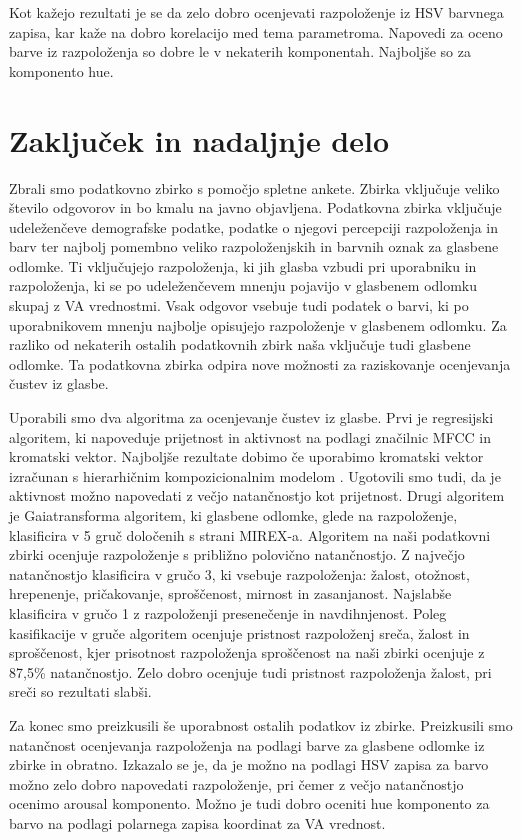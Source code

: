 \documentclass[a4paper, 12pt]{book}
\begin{document}
{Kot kažejo rezultati je se da zelo dobro ocenjevati razpoloženje iz HSV barvnega zapisa, kar kaže na dobro korelacijo med tema parametroma. Napovedi za oceno barve iz razpoloženja so dobre le v nekaterih komponentah. Najboljše so za komponento hue. 

\chapter{Zaključek in nadaljnje delo}

Zbrali smo podatkovno zbirko s pomočjo spletne ankete. Zbirka vključuje veliko število odgovorov in bo kmalu na javno objavljena. Podatkovna zbirka vključuje udeleženčeve demografske podatke, podatke o njegovi percepciji razpoloženja in barv ter najbolj pomembno veliko razpoloženjskih in barvnih oznak za glasbene odlomke. Ti vključujejo razpoloženja, ki jih glasba vzbudi pri uporabniku in razpoloženja, ki se po udeleženčevem mnenju pojavijo v glasbenem odlomku skupaj z VA vrednostmi. Vsak odgovor vsebuje tudi podatek o barvi, ki po uporabnikovem mnenju najbolje opisujejo razpoloženje v glasbenem odlomku. Za razliko od nekaterih ostalih podatkovnih zbirk naša vključuje tudi glasbene odlomke. Ta podatkovna zbirka odpira nove možnosti za raziskovanje ocenjevanja čustev iz glasbe.  

Uporabili smo dva algoritma za ocenjevanje čustev iz glasbe. Prvi je regresijski algoritem, ki napoveduje prijetnost in aktivnost na podlagi značilnic MFCC in kromatski vektor. Najboljše rezultate dobimo če uporabimo kromatski vektor izračunan s hierarhičnim kompozicionalnim modelom \cite{Pesek2013}. Ugotovili smo tudi, da je aktivnost možno napovedati z večjo natančnostjo kot prijetnost. Drugi algoritem je Gaiatransforma algoritem, ki glasbene odlomke, glede na razpoloženje, klasificira v 5 gruč določenih s strani MIREX-a. Algoritem na naši podatkovni zbirki ocenjuje razpoloženje s približno polovično natančnostjo. Z največjo natančnostjo klasificira v gručo 3, ki vsebuje razpoloženja: žalost, otožnost, hrepenenje, pričakovanje, sproščenost, mirnost in zasanjanost. Najslabše klasificira v gručo 1 z razpoloženji presenečenje in navdihnjenost. Poleg kasifikacije v gruče algoritem ocenjuje pristnost razpoloženj sreča, žalost in sproščenost, kjer prisotnost razpoloženja sproščenost na naši zbirki ocenjuje z 87,5\% natančnostjo. Zelo dobro ocenjuje tudi pristnost razpoloženja žalost, pri sreči so rezultati slabši. 

Za konec smo preizkusili še uporabnost ostalih podatkov iz zbirke. Preizkusili smo natančnost ocenjevanja razpoloženja na podlagi barve za glasbene odlomke iz zbirke in obratno. Izkazalo se je, da je možno na podlagi HSV zapisa za barvo možno zelo dobro napovedati razpoloženje, pri čemer z večjo natančnostjo ocenimo arousal komponento. Možno je tudi dobro oceniti hue komponento za barvo na podlagi polarnega zapisa koordinat za VA vrednost. 

}
\end{document}
